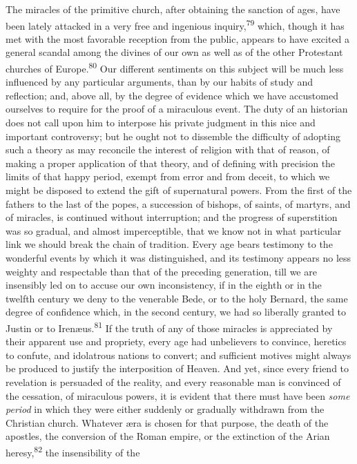 The miracles of the primitive church, after obtaining the
sanction of ages, have been lately attacked in a very free and
ingenious inquiry,\textsuperscript{79} which, though it has met with the most
favorable reception from the public, appears to have excited a
general scandal among the divines of our own as well as of the
other Protestant churches of Europe.\textsuperscript{80} Our different sentiments
on this subject will be much less influenced by any particular
arguments, than by our habits of study and reflection; and, above
all, by the degree of evidence which we have accustomed ourselves
to require for the proof of a miraculous event. The duty of an
historian does not call upon him to interpose his private
judgment in this nice and important controversy; but he ought not
to dissemble the difficulty of adopting such a theory as may
reconcile the interest of religion with that of reason, of making
a proper application of that theory, and of defining with
precision the limits of that happy period, exempt from error and
from deceit, to which we might be disposed to extend the gift of
supernatural powers. From the first of the fathers to the last of
the popes, a succession of bishops, of saints, of martyrs, and of
miracles, is continued without interruption; and the progress of
superstition was so gradual, and almost imperceptible, that we
know not in what particular link we should break the chain of
tradition. Every age bears testimony to the wonderful events by
which it was distinguished, and its testimony appears no less
weighty and respectable than that of the preceding generation,
till we are insensibly led on to accuse our own inconsistency, if
in the eighth or in the twelfth century we deny to the venerable
Bede, or to the holy Bernard, the same degree of confidence
which, in the second century, we had so liberally granted to
Justin or to Irenæus.\textsuperscript{81} If the truth of any of those miracles is
appreciated by their apparent use and propriety, every age had
unbelievers to convince, heretics to confute, and idolatrous
nations to convert; and sufficient motives might always be
produced to justify the interposition of Heaven. And yet, since
every friend to revelation is persuaded of the reality, and every
reasonable man is convinced of the cessation, of miraculous
powers, it is evident that there must have been \textit{some period} in
which they were either suddenly or gradually withdrawn from the
Christian church. Whatever æra is chosen for that purpose, the
death of the apostles, the conversion of the Roman empire, or the
extinction of the Arian heresy,\textsuperscript{82} the insensibility of the
